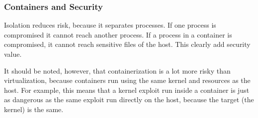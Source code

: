 \subsubsection{Containers and Security}

Isolation reduces risk, because it separates processes. If one process is compromised it cannot reach another process. If a process in a container is compromised, it cannot reach sensitive files of the host. This clearly add security value.

\hfill

It should be noted, however, that containerization is a lot more risky than virtualization, because containers run using the same kernel and resources as the host. For example, this means that a kernel exploit run inside a container is just as dangerous as the same exploit run directly on the host, because the target (the kernel) is the same.
